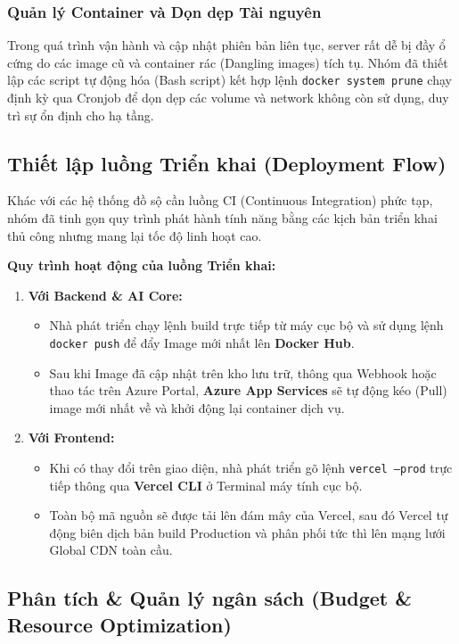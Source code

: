 \subsubsection{Quản lý Container và Dọn dẹp Tài nguyên}
Trong quá trình vận hành và cập nhật phiên bản liên tục, server rất dễ bị đầy ổ cứng do các image cũ và container rác (Dangling images) tích tụ. Nhóm đã thiết lập các script tự động hóa (Bash script) kết hợp lệnh \texttt{docker system prune} chạy định kỳ qua Cronjob để dọn dẹp các volume và network không còn sử dụng, duy trì sự ổn định cho hạ tầng.

\subsection{Thiết lập luồng Triển khai (Deployment Flow)}

Khác với các hệ thống đồ sộ cần luồng CI (Continuous Integration) phức tạp, nhóm đã tinh gọn quy trình phát hành tính năng bằng các kịch bản triển khai thủ công nhưng mang lại tốc độ linh hoạt cao.

\textbf{Quy trình hoạt động của luồng Triển khai:}
\begin{enumerate}
    \item \textbf{Với Backend \& AI Core:} 
    \begin{itemize}
        \item Nhà phát triển chạy lệnh build trực tiếp từ máy cục bộ và sử dụng lệnh \texttt{docker push} để đẩy Image mới nhất lên \textbf{Docker Hub}.
        \item Sau khi Image đã cập nhật trên kho lưu trữ, thông qua Webhook hoặc thao tác trên Azure Portal, \textbf{Azure App Services} sẽ tự động kéo (Pull) image mới nhất về và khởi động lại container dịch vụ.
    \end{itemize}
    \item \textbf{Với Frontend:}
    \begin{itemize}
        \item Khi có thay đổi trên giao diện, nhà phát triển gõ lệnh \texttt{vercel --prod} trực tiếp thông qua \textbf{Vercel CLI} ở Terminal máy tính cục bộ.
        \item Toàn bộ mã nguồn sẽ được tải lên đám mây của Vercel, sau đó Vercel tự động biên dịch bản build Production và phân phối tức thì lên mạng lưới Global CDN toàn cầu.
    \end{itemize}
\end{enumerate}

\subsection{Phân tích \& Quản lý ngân sách (Budget \& Resource Optimization)}

